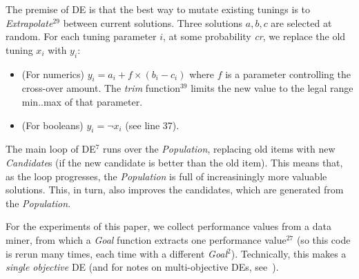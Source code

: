 \documentclass[12pt]{IEEEtran}
\newcommand{\bi}{\begin{itemize}}
\newcommand{\ei}{\end{itemize}}
\begin{document}
The premise of DE  is that the best way to mutate existing tunings
is to {\em Extrapolate}$^{29}$
between current solutions.  Three solutions $a,b,c$ are selected at random.
For each tuning parameter $i$, at some probability {\em cr}, we replace
the old tuning $x_i$ with $y_i$:
\bi
\item (For numerics) $y_i = a_i+f \times (b_i - c_i)$   where $f$ is a parameter
controlling the cross-over amount.  The {\em trim} function$^{39}$ limits the new
value to the legal range min..max of that parameter.
\item (For booleans) $y_i= \neg x_i$ (see line 37).
\ei
The main loop of DE$^7$ runs over the {\em Population}, replacing old items
with new {\em Candidate}s (if the new candidate is better than the old item).
This means that, as the loop progresses, the {\em Population} is full of increasiningly
more valuable solutions. This, in turn, also improves  the candidates, which are generated
from the {\em Population}.

For the experiments of this paper, we collect performance
values from a data miner, from which a {\em Goal} function extracts one 
performance value$^{27}$ (so this code is rerun many times, each time with
a different {\em Goal}$^2$).  Technically, this makes a  {\em single objective} DE (and for notes on multi-objective DEs, see~\cite{Coello05,zhang07,5583335}).
\end{document}

